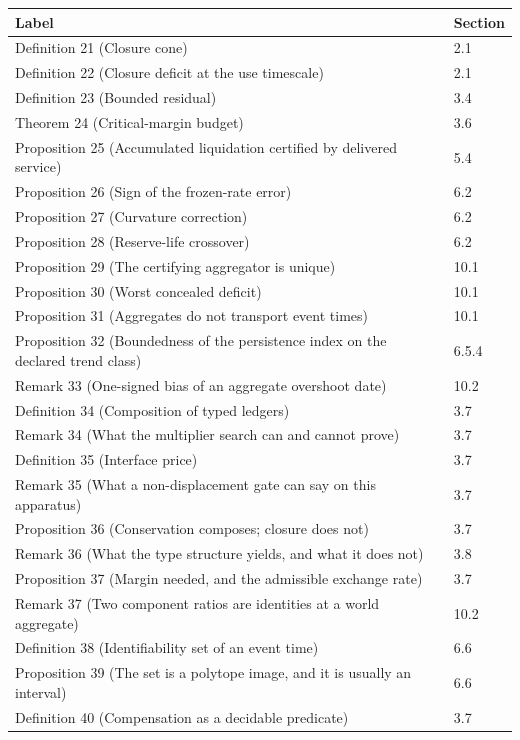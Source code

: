 \documentclass[11pt]{article}
\begin{document}
\begin{longtable}{@{}p{109mm}|l@{}}
\toprule
Label & Section \\
\midrule
Definition 21 (Closure cone) & 2.1 \\
Definition 22 (Closure deficit at the use timescale) & 2.1 \\
Definition 23 (Bounded residual) & 3.4 \\
Theorem 24 (Critical-margin budget) & 3.6 \\
Proposition 25 (Accumulated liquidation certified by delivered service) & 5.4 \\
Proposition 26 (Sign of the frozen-rate error) & 6.2 \\
Proposition 27 (Curvature correction) & 6.2 \\
Proposition 28 (Reserve-life crossover) & 6.2 \\
Proposition 29 (The certifying aggregator is unique) & 10.1 \\
Proposition 30 (Worst concealed deficit) & 10.1 \\
Proposition 31 (Aggregates do not transport event times) & 10.1 \\
Proposition 32 (Boundedness of the persistence index on the declared trend class) & 6.5.4 \\
Remark 33 (One-signed bias of an aggregate overshoot date) & 10.2 \\
Definition 34 (Composition of typed ledgers) & 3.7 \\
Remark 34 (What the multiplier search can and cannot prove) & 3.7 \\
Definition 35 (Interface price) & 3.7 \\
Remark 35 (What a non-displacement gate can say on this apparatus) & 3.7 \\
Proposition 36 (Conservation composes; closure does not) & 3.7 \\
Remark 36 (What the type structure yields, and what it does not) & 3.8 \\
Proposition 37 (Margin needed, and the admissible exchange rate) & 3.7 \\
Remark 37 (Two component ratios are identities at a world aggregate) & 10.2 \\
Definition 38 (Identifiability set of an event time) & 6.6 \\
Proposition 39 (The set is a polytope image, and it is usually an interval) & 6.6 \\
Definition 40 (Compensation as a decidable predicate) & 3.7 \\

\end{longtable}
\end{document}
